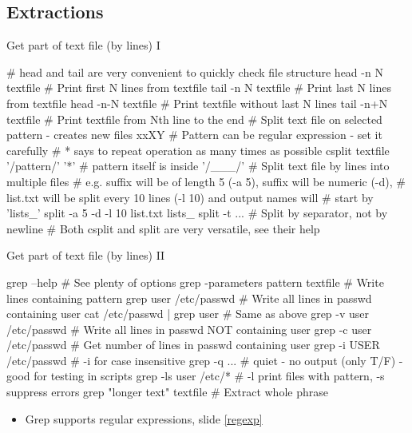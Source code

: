 \documentclass[compress, ucs, xelatex, 11pt, xcolor=svgnames, aspectratio=169,
	hyperref={
		bookmarks=true,
		unicode=true,
		colorlinks=true,
		pdftitle={Linux, command line and MetaCentrum},
		plainpages=false,
		pdfauthor={Vojtech Zeisek},
		pdfsubject={Course about use of Linux command line, writing shell scripts and using MetaCentrum of CESNET},
		pdfcreator={XeLaTeX},
		pdfkeywords={Linux, GNU, BASH, shell, command line, MetaCentrum},
		linkcolor=DarkRed, %
		anchorcolor=DarkBlue, %
		citecolor=Indigo, %
		filecolor=NavyBlue, %
		menucolor=DarkMagenta, %
		urlcolor=DarkBlue, %
		pdftex},
	url={hyphens, lowtilde} %
	]{beamer}
\begin{document}
\subsection{Extractions}

\begin{frame}[fragile]{Get part of text file (by lines) I}
	\begin{bashcode}
    # head and tail are very convenient to quickly check file structure
    head -n N textfile # Print first N lines from textfile
    tail -n N textfile # Print last N lines from textfile
    head -n-N textfile # Print textfile without last N lines
    tail -n+N textfile # Print textfile from Nth line to the end
    # Split text file on selected pattern - creates new files xxXY
    # Pattern can be regular expression - set it carefully
    # {*} says to repeat operation as many times as possible
    csplit textfile '/pattern/' '{*}' # pattern itself is inside '/___/'
    # Split text file by lines into multiple files
    # e.g. suffix will be of length 5 (-a 5), suffix will be numeric (-d),
    # list.txt will be split every 10 lines (-l 10) and output names will
    # start by 'lists_'
    split -a 5 -d -l 10 list.txt lists_
    split -t ... # Split by separator, not by newline
    # Both csplit and split are very versatile, see their help
	\end{bashcode}
\end{frame}

\begin{frame}[fragile]{Get part of text file (by lines) II}
	\begin{bashcode}
    grep --help # See plenty of options
    grep -parameters pattern textfile # Write lines containing pattern
    grep user /etc/passwd # Write all lines in passwd containing user
    cat /etc/passwd | grep user # Same as above
    grep -v user /etc/passwd # Write all lines in passwd NOT containing user
    grep -c user /etc/passwd # Get number of lines in passwd containing user
    grep -i USER /etc/passwd # -i for case insensitive
    grep -q ... # quiet - no output (only T/F) - good for testing in scripts
    grep -ls user /etc/* # -l print files with pattern, -s suppress errors
    grep "longer text" textfile # Extract whole phrase
	\end{bashcode}
	\begin{itemize}
		\item Grep supports regular expressions, slide \ref{regexp}
	\end{itemize}
\end{frame}
\end{document}
